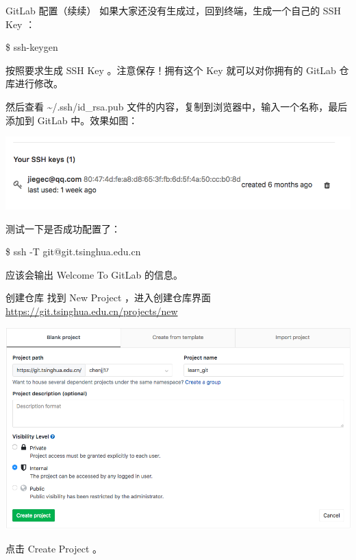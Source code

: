 \documentclass{beamer}
\begin{document}
\begin{frame}{GitLab 配置（续续）}
    如果大家还没有生成过，回到终端，生成一个自己的 SSH Key ：

    \$ ssh-keygen

    按照要求生成 SSH Key 。注意保存！拥有这个 Key 就可以对你拥有的 GitLab 仓库进行修改。

    然后查看 \~{}/.ssh/id\_rsa.pub 文件的内容，复制到浏览器中，输入一个名称，最后添加到 GitLab 中。效果如图：

    \includegraphics[width=\linewidth]{2018-10-25-11-42-06.png}

    测试一下是否成功配置了：

    \$ ssh -T git@git.tsinghua.edu.cn

    应该会输出 Welcome To GitLab 的信息。

\end{frame}

\begin{frame}{创建仓库}
    找到 New Project ，进入创建仓库界面 \url{https://git.tsinghua.edu.cn/projects/new}

    \includegraphics[width=\linewidth]{2018-10-25-11-54-08.png}

    点击 Create Project 。

\end{frame}
\end{document}

